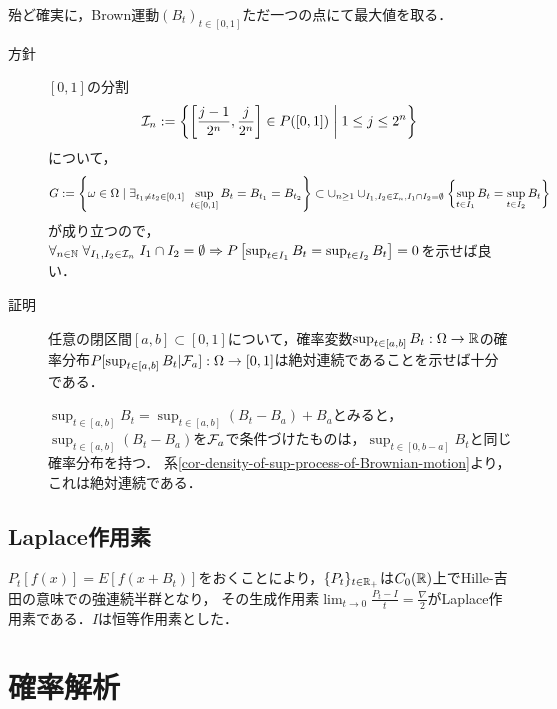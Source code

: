 \documentclass[uplatex,dvipdfmx]{jsreport}
\begin{document}
\begin{lemma}
    殆ど確実に，Brown運動$(B_t)_{t\in[0,1]}$ただ一つの点にて最大値を取る．
\end{lemma}
\begin{Proof}\mbox{}
    \begin{description}
        \item[方針] $[0,1]$の分割
        \[\mathcal{I}_n:=\left\{\left[\frac{j-1}{2^n},\frac{j}{2^n}\right]\in P([0,1])\;\middle|\;1\le j\le 2^n\right\}\]
        について，
        \[G:=\left\{\omega\in\Omega\mid\exists_{t_1\ne t_2\in[0,1]}\;\sup_{t\in[0,1]}B_t=B_{t_1}=B_{t_2}\right\}\subset\cup_{n\ge 1}\cup_{I_1,I_2\in\mathcal{I}_n,I_1\cap I_2=\emptyset}\left\{\sup_{t\in I_1}B_t=\sup_{t\in I_2}B_t\right\}\]
        が成り立つので，$\forall_{n\in\mathbb{N}}\;\forall_{I_1,I_2\in\mathcal{I}_n}\;I_1\cap I_2=\emptyset\Rightarrow P\left[\sup_{t\in I_1}B_t=\sup_{t\in I_2}B_t\right]=0$を示せば良い．
        \item[証明] 任意の閉区間$[a,b]\subset[0,1]$について，確率変数$\sup_{t\in[a,b]}B_t:\Omega\to\mathbb{R}$の確率分布$P[\sup_{t\in[a,b]}B_t|\mathcal{F}_a]:\Omega\to[0,1]$は絶対連続であることを示せば十分である．
        
        $\sup_{t\in[a,b]}B_t=\sup_{t\in[a,b]}(B_t-B_a)+B_a$とみると，
        $\sup_{t\in[a,b]}(B_t-B_a)$を$\mathcal{F}_a$で条件づけたものは，$\sup_{t\in[0,b-a]}B_t$と同じ確率分布を持つ．
        系\ref{cor-density-of-sup-process-of-Brownian-motion}より，これは絶対連続である．
    \end{description}
\end{Proof}


\section{Laplace作用素}

\begin{tcolorbox}[colframe=ForestGreen, colback=ForestGreen!10!white,breakable,colbacktitle=ForestGreen!40!white,coltitle=black,fonttitle=\bfseries\sffamily,
title=]
    $P_t[f(x)]=E[f(x+B_t)]$をおくことにより，$\{P_t\}_{t\in\mathbb{R}_+}$は$C_0(\mathbb{R})$上でHille-吉田の意味での強連続半群となり，
    その生成作用素$\lim_{t\to0}\frac{P_t-I}{t}=\frac{\nabla}{2}$がLaplace作用素である．$I$は恒等作用素とした．
\end{tcolorbox}



\chapter{確率解析}
\end{document}
